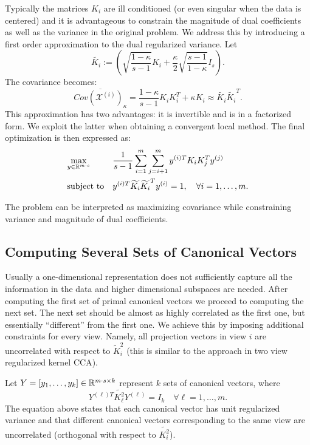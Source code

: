 Typically the matrices $K_i$ are ill conditioned (or even singular
when the data is centered) and it is advantageous to constrain the
magnitude of dual coefficients as well as the variance in the original
problem. We address this by introducing a first order approximation to
the dual regularized variance. Let
$$\widetilde{K_i} := \left(\sqrt{\frac{1-\kappa}{s - 1}}K_i + \frac{\kappa}{2}
  \sqrt{\frac{s-1}{1- \kappa}}I_s\right).$$
The covariance becomes:
$$ \overline{Cov\left(\mathcal{X}^{(i)}\right)_{\kappa}} =
 \frac{1- \kappa}{s - 1}K_i K_i^T + \kappa  K_i \approx  \widetilde{K_i} \widetilde{K_i}^T.$$
This approximation has two advantages: it is invertible and is in a
factorized form. We exploit the latter when obtaining a convergent local method.
The final optimization is then expressed as:
 \begin{equation}\label{eq:approxdualqcqp}
\begin{aligned}
& \underset{y \in \mathbb{R}^{m\cdot s}}{\text{max}}
& & \frac{1}{s - 1} \sum_{i = 1}^m \sum_{j = i+1}^m y^{(i)T} K_i K_j^T y^{(j)}\\
& \text{subject to}
& & y^{(i)T} \widetilde{K_i} \widetilde{K_i}^T y^{(i)} = 1, \quad\forall i = 1,\ldots, m.
\end{aligned}
\end{equation}

The problem can be interpreted as maximizing covariance while constraining variance
and magnitude of dual coefficients.

\subsection{Computing Several Sets of Canonical Vectors}\label{chap:extensions:severalCanonicalVectors}
Usually a one-dimensional representation does not sufficiently capture
all the information in the data and higher dimensional subspaces are
needed. After computing the first set of primal canonical vectors we
proceed to computing the next set. The next set should be almost as
highly correlated as the first one, but essentially ``different'' from
the first one. We achieve this by imposing additional constraints for
every view. Namely, all projection vectors in view $i$ are
uncorrelated with respect to $\widetilde{K}_i^2$ (this is similar to
the approach in two view regularized kernel CCA\cite{FBMJ}).
\par
Let $Y = \left[y_1, \ldots, y_k\right] \in \mathbb{R}^{m\cdot s  \times k}$
represent $k$ sets of canonical vectors, where
$$Y^{(\ell)T} \widetilde{K_{\ell}^2} Y^{(\ell)} = I_k  \quad\forall \ell = 1,\ldots, m. $$
The equation above states that each canonical vector has unit regularized variance
and that different canonical vectors corresponding to the same view are
uncorrelated (orthogonal with respect to $\widetilde{K_i^2}$).

